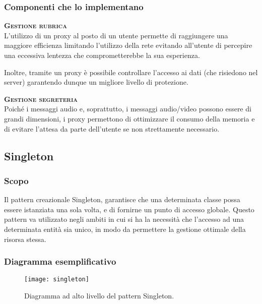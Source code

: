 \subsubsection{Componenti che lo implementano}
\begin{description}
  \item{\bfseries\scshape Gestione rubrica}\\
L'utilizzo di un proxy al posto di un utente permette di raggiungere una maggiore efficienza limitando l'utilizzo della rete evitando all'utente di percepire una eccessiva lentezza che comprometterebbe la sua esperienza.

Inoltre, tramite un proxy è possibile controllare l'accesso ai dati (che risiedono nel server) garantendo dunque un migliore livello di protezione.
  \item{\bfseries\scshape Gestione segreteria}\\
Poiché i messaggi audio e, soprattutto, i messaggi audio/video possono essere di grandi dimensioni, i proxy permettono di ottimizzare il consumo della memoria e di evitare l'attesa da parte dell'utente se non strettamente necessario.
\end{description}

\subsection{Singleton}

\subsubsection{Scopo}
Il pattern creazionale Singleton, garantisce che una determinata classe possa essere istanziata una sola volta, e di fornirne un punto di accesso globale. Questo pattern va utilizzato negli ambiti in cui si ha la necessità che l'accesso ad una determinata entità sia unico, in modo da permettere la gestione ottimale della risorsa stessa.

\subsubsection{Diagramma esemplificativo}
\begin{figure}[h]
\centering
\texttt{[image: singleton]}
\caption{Diagramma ad alto livello del pattern Singleton.}\label{fig:singleton}
\end{figure}

